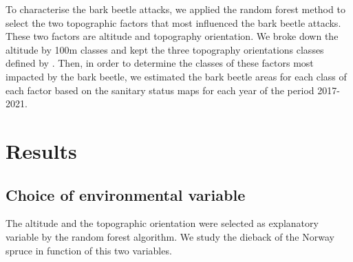 \documentclass[3p,procedia]{elsarticle}
\begin{document}
To characterise the bark beetle attacks, we applied the random forest method to select the two topographic factors that most influenced the bark beetle attacks.
These two factors are altitude and topography orientation. We broke down the altitude by 100m classes and kept the three topography orientations classes defined by \cite{Delvaux_galoux}.
Then, in order to determine the classes of these factors most impacted by the bark beetle, we estimated the bark beetle areas for each class of each factor based on the sanitary status maps for each year of the period 2017-2021.





	






\section{Results}

\subsection{Choice of environmental variable}
The altitude and the topographic orientation were selected as explanatory variable by the random forest algorithm.
We study the dieback of the Norway spruce in function of this two variables.
\end{document}
